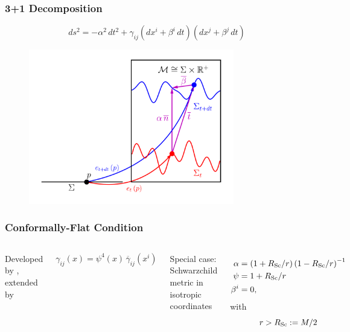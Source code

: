 \documentclass{beamer}
\begin{document}
\begin{frame}
\frametitle{3+1 Decomposition}

  \begin{equation*}
    ds^{2}
    =-\alpha^{2}\,dt^{2}
     +\gamma_{ij}\left(dx^{i}+\beta^{i}\,dt\right)
                 \left(dx^{j}+\beta^{j}\,dt\right)
  \end{equation*}

  \vspace{-0.5em}

  \begin{figure}[htb!]
    \centering
    \includegraphics[width=0.8\textwidth]{fig.1p1.png}
  \end{figure}

\end{frame}

\begin{frame}
\frametitle{Conformally-Flat Condition}

  \begin{columns}[c]


      Developed by \citet{wmm1996}, extended by \citet{cc2009}

      \begin{equation*}
        \gamma_{ij}\left(x\right)
        =\psi^{4}\left(x\right)\,\overline{\gamma}_{ij}\left(x^{i}\right)
      \end{equation*}


      Special case: Schwarzchild metric in isotropic coordinates

      \begin{align*}
        \alpha&=\left(1+R_{\mathrm{Sc}}/r\right)\left(1-R_{\mathrm{Sc}}/r\right)^{-1} \\
        \psi&=1+R_{\mathrm{Sc}}/r \\
        \beta^{i}&=0,
      \end{align*}
      with
      \begin{equation*}
        r>R_{\mathrm{Sc}}:=M/2
      \end{equation*}

  \end{columns}

\end{frame}
\end{document}

